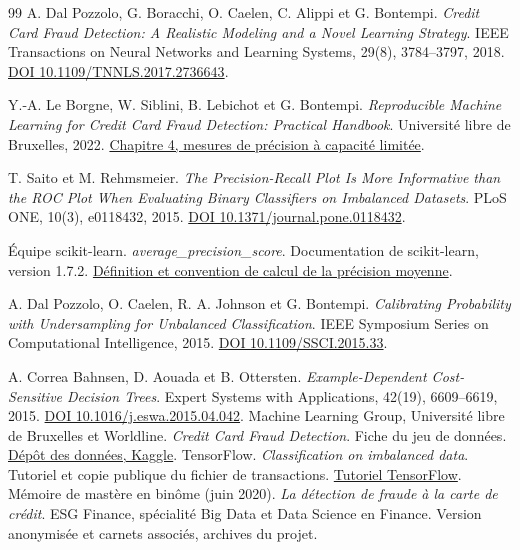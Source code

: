 \documentclass[11pt,a4paper]{article}
\begin{document}
\begin{thebibliography}{99}\small
{}
A. Dal Pozzolo, G. Boracchi, O. Caelen, C. Alippi et G. Bontempi.
\emph{Credit Card Fraud Detection: A Realistic Modeling and a Novel Learning Strategy}.
IEEE Transactions on Neural Networks and Learning Systems, 29(8), 3784--3797, 2018.
\href{https://doi.org/10.1109/TNNLS.2017.2736643}{DOI 10.1109/TNNLS.2017.2736643}.

Y.-A. Le Borgne, W. Siblini, B. Lebichot et G. Bontempi.
\emph{Reproducible Machine Learning for Credit Card Fraud Detection: Practical Handbook}.
Université libre de Bruxelles, 2022.
\href{https://fraud-detection-handbook.github.io/fraud-detection-handbook/Chapter_4_PerformanceMetrics/TopKBased.html}{Chapitre 4, mesures de précision à capacité limitée}.

T. Saito et M. Rehmsmeier.
\emph{The Precision-Recall Plot Is More Informative than the ROC Plot When Evaluating Binary Classifiers on Imbalanced Datasets}.
PLoS ONE, 10(3), e0118432, 2015.
\href{https://doi.org/10.1371/journal.pone.0118432}{DOI 10.1371/journal.pone.0118432}.

Équipe scikit-learn. \emph{average\_precision\_score}. Documentation de scikit-learn, version 1.7.2.
\href{https://scikit-learn.org/1.7/modules/generated/sklearn.metrics.average_precision_score.html}{Définition et convention de calcul de la précision moyenne}.

A. Dal Pozzolo, O. Caelen, R. A. Johnson et G. Bontempi.
\emph{Calibrating Probability with Undersampling for Unbalanced Classification}.
IEEE Symposium Series on Computational Intelligence, 2015.
\href{https://doi.org/10.1109/SSCI.2015.33}{DOI 10.1109/SSCI.2015.33}.

A. Correa Bahnsen, D. Aouada et B. Ottersten.
\emph{Example-Dependent Cost-Sensitive Decision Trees}.
Expert Systems with Applications, 42(19), 6609--6619, 2015.
\href{https://doi.org/10.1016/j.eswa.2015.04.042}{DOI 10.1016/j.eswa.2015.04.042}.
 Machine Learning Group, Université libre de Bruxelles et Worldline. \emph{Credit Card Fraud Detection}. Fiche du jeu de données. \href{https://www.kaggle.com/datasets/mlg-ulb/creditcardfraud}{Dépôt des données, Kaggle}.
 TensorFlow. \emph{Classification on imbalanced data}. Tutoriel et copie publique du fichier de transactions. \href{https://www.tensorflow.org/tutorials/structured_data/imbalanced_data}{Tutoriel TensorFlow}.
 Mémoire de mastère en binôme (juin 2020). \emph{La détection de fraude à la carte de crédit}. ESG Finance, spécialité Big Data et Data Science en Finance. Version anonymisée et carnets associés, archives du projet.
\end{thebibliography}
\clearpage
\appendix
\end{document}
